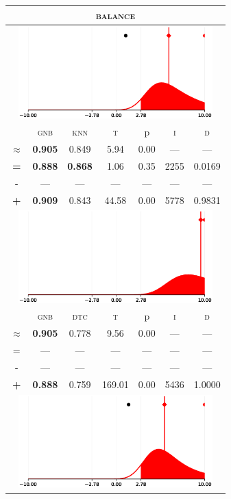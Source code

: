 \begin{tabular}{c||cc||c|c|c||c}
	\toprule
	\multicolumn{7}{c}{\textsc{balance}}\\
	\bottomrule
	\multicolumn{7}{c}{\includegraphics[width=7.5cm, trim=30 0 30 0]{figures/balance_0.eps}}\\

\midrule	&\textsc{gnb} & \textsc{knn} & \textsc{t} & p & \textsc{i} & \textsc{d}\\
	\color{red} $\approx$ & \color{red} \bfseries 0.905 &\color{red}   0.849 & 5.94 & 0.00 & --- & ---\\\midrule
	{\bfseries\color{black}\tiny=}& \color{black} \bfseries 0.888 & \color{black} \bfseries 0.868 & 1.06 & 0.35 & 2255 & \color{black} 0.0169\\
	{\tiny-}& --- & --- & --- & --- & --- & ---\\
	{\bfseries\color{red}\tiny+}& \color{red} \bfseries 0.909 & \color{red}  0.843 & 44.58 & 0.00 & 5778 & \color{red} 0.9831\\
	\bottomrule
	\multicolumn{7}{c}{\includegraphics[width=7.5cm, trim=30 0 30 0]{figures/balance_1.eps}}\\

\midrule	&\textsc{gnb} & \textsc{dtc} & \textsc{t} & p & \textsc{i} & \textsc{d}\\
	\color{red} $\approx$ & \color{red} \bfseries 0.905 &\color{red}   0.778 & 9.56 & 0.00 & --- & ---\\\midrule
	{\tiny=}& --- & --- & --- & --- & --- & ---\\
	{\tiny-}& --- & --- & --- & --- & --- & ---\\
	{\bfseries\color{red}\tiny+}& \color{red} \bfseries 0.888 & \color{red}  0.759 & 169.01 & 0.00 & 5436 & \color{red} 1.0000\\
	\bottomrule
	\multicolumn{7}{c}{\includegraphics[width=7.5cm, trim=30 0 30 0]{figures/balance_2.eps}}\\


\end{tabular}
